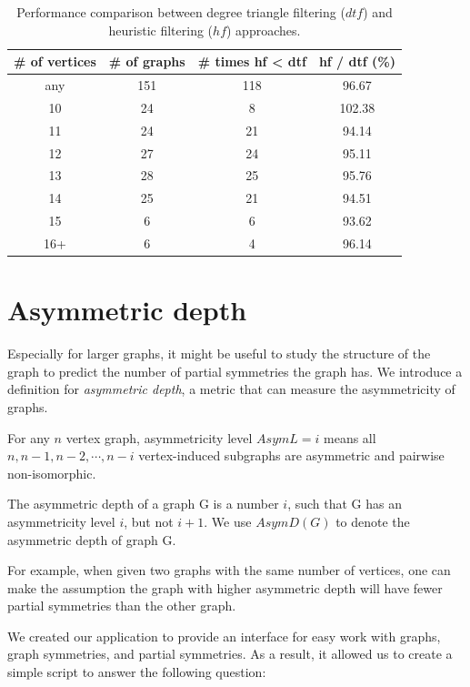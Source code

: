 \begin{table}
\begin{tabular}{ | c | c | c | c |}
\hline
\# of vertices & \# of graphs & \# times hf < dtf & hf / dtf (\%) \\
\hline
any & 151 & 118 & 96.67 \\
10 & 24 & 8 & 102.38 \\
11 & 24 & 21 & 94.14 \\
12 & 27 & 24 & 95.11 \\
13 & 28 & 25 & 95.76 \\
14 & 25 & 21 & 94.51 \\
15 & 6 & 6 & 93.62 \\
16+ & 6 & 4 & 96.14 \\
\hline
\end{tabular}
\caption{\label{tab:hfvsdtf} Performance comparison between degree triangle filtering ($dtf$) and heuristic filtering ($hf$) approaches.}
\end{table}

\section{Asymmetric depth}

Especially for larger graphs, it might be useful to study the structure of the graph to predict the number of partial symmetries the graph has. We introduce a definition for \emph{asymmetric depth}, a metric that can measure the asymmetricity of graphs.

\begin{definition}
\label{def:asymmetric_depth}
For any $n$ vertex graph, asymmetricity level $AsymL = i$ means all $n, n-1, n-2, \cdots, n - i$ vertex-induced subgraphs are asymmetric and pairwise non-isomorphic.

The asymmetric depth of a graph G is a number $i$, such that G has an asymmetricity level $i$, but not $i+1$. We use $AsymD(G)$ to denote the asymmetric depth of graph G.
\end{definition}

For example, when given two graphs with the same number of vertices, one can make the assumption the graph with higher asymmetric depth will have fewer partial symmetries than the other graph.

We created our application to provide an interface for easy work with graphs, graph symmetries, and partial symmetries. As a result, it allowed us to create a simple script to answer the following question:

